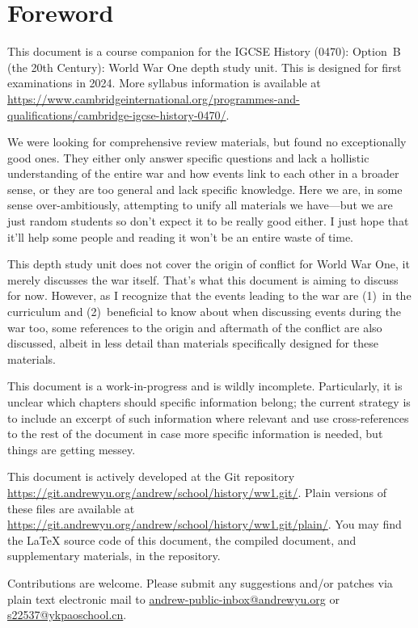 \documentclass[a4paper,numbers=endperiod,most,twoside,english,final,openany]{scrbook} %
\newcommand{\myurl}[1]{\href{#1}{#1}}
\begin{document}
\endgroup

\chapter{Foreword}

This document is a course companion for the IGCSE History (0470): Option~B (the 20th Century): World War One depth study unit. This is designed for first examinations in 2024. More syllabus information is available at \myurl{https://www.cambridgeinternational.org/programmes-and-qualifications/cambridge-igcse-history-0470/}.

We were looking for comprehensive review materials, but found no exceptionally good ones.  They either only answer specific questions and lack a hollistic understanding of the entire war and how events link to each other in a broader sense, or they are too general and lack specific knowledge.  Here we are, in some sense over-ambitiously, attempting to unify all materials we have---but we are just random students so don't expect it to be really good either.  I just hope that it'll help some people and reading it won't be an entire waste of time.

This depth study unit does not cover the origin of conflict for World War One, it merely discusses the war itself.  That's what this document is aiming to discuss for now.  However, as I recognize that the events leading to the war are (1)~in the curriculum and (2)~beneficial to know about when discussing events during the war too, some references to the origin and aftermath of the conflict are also discussed, albeit in less detail than materials specifically designed for these materials.

This document is a work-in-progress and is wildly incomplete. Particularly, it is unclear which chapters should specific information belong; the current strategy is to include an excerpt of such information where relevant and use cross-references to the rest of the document in case more specific information is needed, but things are getting messey.  

This document is actively developed at the Git repository \myurl{https://git.andrewyu.org/andrew/school/history/ww1.git/}.  Plain versions of these files are available at \myurl{https://git.andrewyu.org/andrew/school/history/ww1.git/plain/}.  You may find the {\LaTeX} source code of this document, the compiled document, and supplementary materials, in the repository.

Contributions are welcome.  Please submit any suggestions and/or patches via plain text electronic mail to \href{mailto:andrew-public-inbox@andrewyu.org}{andrew-public-inbox@andrewyu.org} or \href{mailto:s22537@ykpaoschool.cn}{s22537@ykpaoschool.cn}.
\end{document}
